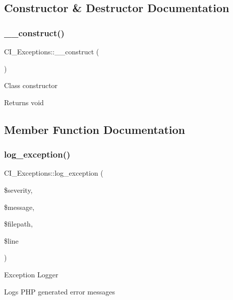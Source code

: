 \subsection{Constructor \& Destructor Documentation}
\mbox{\label{class_c_i___exceptions_ac9cc7d0bb90a5e2ae6eef7753a771a91}} 
\subsubsection{\texorpdfstring{\+\_\+\+\_\+construct()}{\_\_construct()}}
{\footnotesize\ttfamily C\+I\+\_\+\+Exceptions\+::\+\_\+\+\_\+construct (\begin{DoxyParamCaption}{ }\end{DoxyParamCaption})}

Class constructor

\begin{DoxyReturn}{Returns}
void 
\end{DoxyReturn}


\subsection{Member Function Documentation}
\mbox{\label{class_c_i___exceptions_a49d733e9740d9d638829a1854d67fffe}} 
\subsubsection{\texorpdfstring{log\+\_\+exception()}{log\_exception()}}
{\footnotesize\ttfamily C\+I\+\_\+\+Exceptions\+::log\+\_\+exception (\begin{DoxyParamCaption}\item[{}]{\$severity,  }\item[{}]{\$message,  }\item[{}]{\$filepath,  }\item[{}]{\$line }\end{DoxyParamCaption})}

Exception Logger

Logs P\+HP generated error messages


